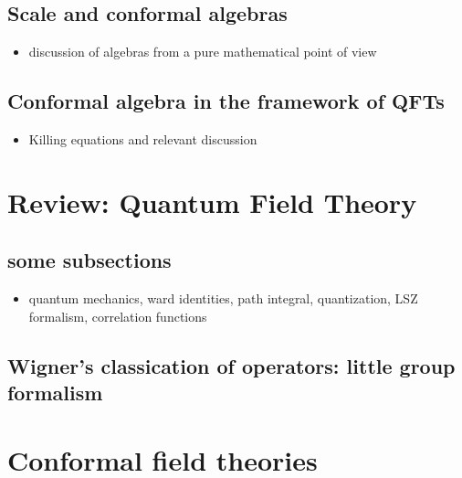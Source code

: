 \documentclass[12pt]{article}
\numberwithin{equation}{section}
\begin{document}
\subsection{Scale and conformal algebras}
\begin{itemize}
	\item discussion of algebras from a pure mathematical point of view
\end{itemize}

\subsection{Conformal algebra in the framework of QFTs}
\begin{itemize}
	\item Killing equations and relevant discussion
\end{itemize}

\section{Review: Quantum Field Theory}
\subsection{some subsections}
\begin{itemize}
	\item quantum mechanics, ward identities, path integral, quantization,
	LSZ formalism, correlation functions
\end{itemize}
\subsection{Wigner's classication of operators: little group formalism}

\section{Conformal field theories}


{}

\end{document}
